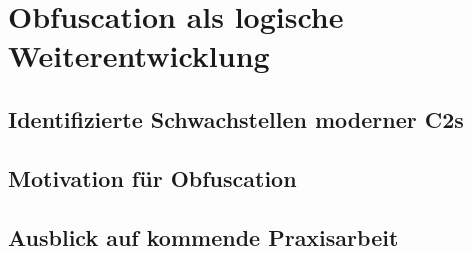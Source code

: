 \section{Obfuscation als logische Weiterentwicklung}
\subsection{Identifizierte Schwachstellen moderner C2s}
\subsection{Motivation für Obfuscation}
\subsection{Ausblick auf kommende Praxisarbeit}